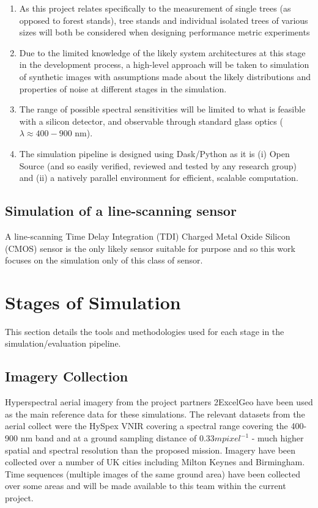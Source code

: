 \documentclass[10pt,a4paper,final,twocolumn]{article}
\begin{document}
\begin{enumerate}
\item As this project relates specifically to the measurement of single trees (as opposed to forest stands), tree stands and individual isolated trees of various sizes will both be considered when designing performance metric experiments
\item Due to the limited knowledge of the likely system architectures at this stage in the development process, a high-level approach will be taken to simulation of synthetic images with assumptions made about the likely distributions and properties of noise at different stages in the simulation.
\item The range of possible spectral sensitivities will be limited to what is feasible with a silicon detector, and observable through standard glass optics ($\lambda \approx 400 - 900$ nm).
\item The simulation pipeline is designed using Dask/Python as it is (i) Open Source (and so easily verified, reviewed and tested by any research group) and (ii) a natively parallel environment for efficient, scalable computation.
\end{enumerate}
 
\subsection{Simulation of a line-scanning sensor}
A line-scanning Time Delay Integration (TDI) Charged Metal Oxide Silicon (CMOS) sensor is the only likely sensor suitable for purpose and so this work focuses on the simulation only of this class of sensor.

\section{Stages of Simulation}
This section details the tools and methodologies used for each stage in the simulation/evaluation pipeline.
\subsection{Imagery Collection}
Hyperspectral aerial imagery from the project partners 2ExcelGeo have been used as the main reference data for these simulations. The relevant datasets from the aerial collect were the HySpex VNIR covering a spectral range covering the 400-900 nm band and at a ground sampling distance of $0.33 m pixel^{-1}$ - much higher spatial and spectral resolution than the proposed mission. Imagery have been collected over a number of UK cities including Milton Keynes and Birmingham. Time sequences (multiple images of the same ground area) have been collected over some areas and will be made available to this team within the current project.
\end{document}
